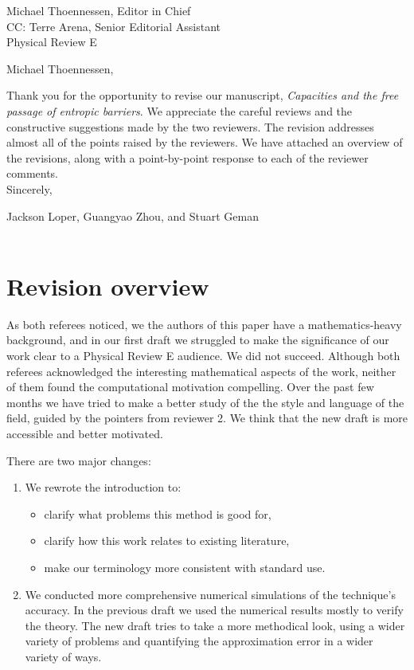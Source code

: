 \documentclass{article}
\begin{document}
\hfill{}\begin{minipage}{4in}
\raggedleft
Michael Thoennessen, Editor in Chief\\
CC: Terre Arena, Senior Editorial Assistant\\
Physical Review E\\
\end{minipage}

\vspace{.5in}

\noindent
Michael Thoennessen,

\vspace{.2in}

Thank you for the opportunity to revise our manuscript, {\em Capacities and the free passage of entropic barriers}. We appreciate the careful reviews and the constructive suggestions made by the two reviewers.   The revision addresses almost all of the points raised by the reviewers. We have attached an overview of the revisions, along with a point-by-point response to each of the reviewer comments. \\

\noindent
Sincerely,

Jackson Loper, Guangyao Zhou, and Stuart Geman\\\\


\newpage

\section{Revision overview}

As both referees noticed, we the authors of this paper have a mathematics-heavy background, and in our first draft we struggled to make the significance of our work clear to a Physical Review E audience.  We did not succeed.  Although both referees acknowledged the interesting mathematical aspects of the work, neither of them found the computational motivation compelling.  Over the past few months we have tried to make a better study of the the style and language of the field, guided by the pointers from reviewer 2.  We think that the new draft is more accessible and better motivated.

There are two major changes:
\begin{enumerate}
    \item We rewrote the introduction to:
    \begin{itemize}
        \item clarify what problems this method is good for,
        \item clarify how this work relates to existing literature,
        \item make our terminology more consistent with standard use.
    \end{itemize}
    \item We conducted more comprehensive numerical simulations of the technique's accuracy.  In the previous draft we used the numerical results mostly to verify the theory.  The new draft tries to take a more methodical look, using a wider variety of problems and quantifying the approximation error in a wider variety of ways.  
\end{enumerate}
\end{document}
